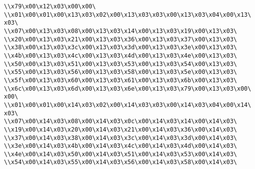 \verb|\\x79\x00\x12\x03\x00\x00\|\newline
\verb|\\x01\x00\x01\x00\x13\x03\x02\x00\x13\x03\x03\x00\x13\x03\x04\x00\x13\x03\|\newline
\verb|\\x07\x00\x13\x03\x08\x00\x13\x03\x14\x00\x13\x03\x19\x00\x13\x03\|\newline
\verb|\\x20\x00\x13\x03\x21\x00\x13\x03\x36\x00\x13\x03\x37\x00\x13\x03\|\newline
\verb|\\x38\x00\x13\x03\x3c\x00\x13\x03\x3d\x00\x13\x03\x3e\x00\x13\x03\|\newline
\verb|\\x4b\x00\x13\x03\x4c\x00\x13\x03\x4d\x00\x13\x03\x4e\x00\x13\x03\|\newline
\verb|\\x50\x00\x13\x03\x51\x00\x13\x03\x53\x00\x13\x03\x54\x00\x13\x03\|\newline
\verb|\\x55\x00\x13\x03\x56\x00\x13\x03\x58\x00\x13\x03\x5e\x00\x13\x03\|\newline
\verb|\\x5f\x00\x13\x03\x60\x00\x13\x03\x61\x00\x13\x03\x6b\x00\x13\x03\|\newline
\verb|\\x6c\x00\x13\x03\x6d\x00\x13\x03\x6e\x00\x13\x03\x79\x00\x13\x03\x00\x00\|\newline
\verb|\\x01\x00\x01\x00\x14\x03\x02\x00\x14\x03\x03\x00\x14\x03\x04\x00\x14\x03\|\newline
\verb|\\x07\x00\x14\x03\x08\x00\x14\x03\x0c\x00\x14\x03\x14\x00\x14\x03\|\newline
\verb|\\x19\x00\x14\x03\x20\x00\x14\x03\x21\x00\x14\x03\x36\x00\x14\x03\|\newline
\verb|\\x37\x00\x14\x03\x38\x00\x14\x03\x3c\x00\x14\x03\x3d\x00\x14\x03\|\newline
\verb|\\x3e\x00\x14\x03\x4b\x00\x14\x03\x4c\x00\x14\x03\x4d\x00\x14\x03\|\newline
\verb|\\x4e\x00\x14\x03\x50\x00\x14\x03\x51\x00\x14\x03\x53\x00\x14\x03\|\newline
\verb|\\x54\x00\x14\x03\x55\x00\x14\x03\x56\x00\x14\x03\x58\x00\x14\x03\|\newline
